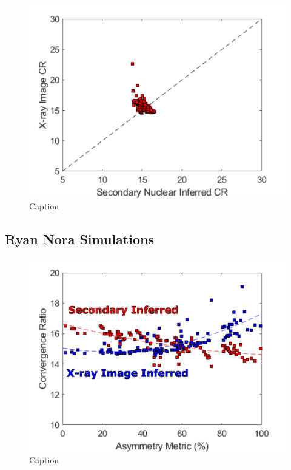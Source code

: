 \begin{figure}
    \centering
    \includegraphics[scale=0.7]{Figures/noraXrayNucCR.pdf}
    \caption{Caption}
    \label{fig:}
\end{figure}

\subsection{Ryan Nora Simulations}



\begin{figure}
    \centering
    \includegraphics[scale=0.7]{Figures/noraXrayNucCRAsym.pdf}
    \caption{Caption}
    \label{fig:my_label}
\end{figure}
